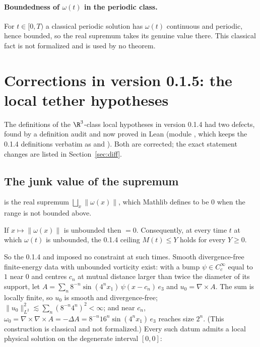 \paragraph{Boundedness of $\omega(t)$ in the periodic class.} For $t\in[0,T)$ a classical periodic solution has
$\omega(t)$ continuous and periodic, hence bounded, so the real supremum  takes its genuine
value there. This classical fact is not formalized and is used by no theorem.

\section{Corrections in version 0.1.5: the local tether hypotheses}\label{sec:corr}

The definitions of the $\R^3$-class local hypotheses in version 0.1.4 had two defects, found by a definition
audit and now proved in Lean (module , which keeps the 0.1.4 definitions verbatim
as  and ). Both are corrected; the exact statement changes
are listed in Section~\ref{sec:diff}.

\subsection{The junk value of the supremum}
 is the real supremum $\bigsqcup_x\|\omega(x)\|$, which Mathlib defines to be $0$
when the range is not bounded above.

\begin{theorem}
If $x\mapsto\|\omega(x)\|$ is unbounded then  $=0$. Consequently, at every time $t$
at which $\omega(t)$ is unbounded, the 0.1.4 ceiling $M(t)\le Y$ holds for every $Y\ge0$.
\end{theorem}

So the 0.1.4  and  imposed no constraint at such
times. Smooth divergence-free finite-energy data with unbounded vorticity exist: with a bump $\psi\in C_c^\infty$
equal to $1$ near $0$ and centres $c_n$ at mutual distance larger than twice the diameter of its support, let
$A=\sum_n 8^{-n}\sin(4^nx_1)\,\psi(x-c_n)\,e_3$ and $u_0=\nabla\times A$. The sum is locally finite, so $u_0$ is
smooth and divergence-free; $\|u_0\|_{L^2}^2\lesssim\sum_n(8^{-n}4^n)^2<\infty$; and near $c_n$,
$\omega_0=\nabla\times\nabla\times A=-\Delta A=8^{-n}16^n\sin(4^nx_1)\,e_3$ reaches size $2^n$. (This
construction is classical and not formalized.) Every such datum admits a local physical solution on the
degenerate interval $[0,0]$:

